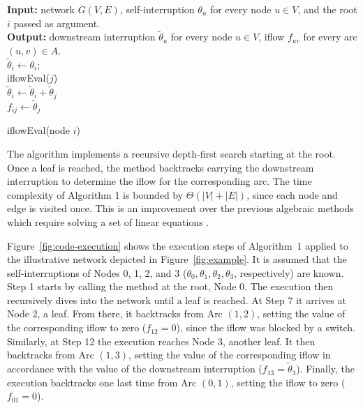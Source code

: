 \begin{algorithm}[H]
\textbf{Input:} network $G(V,E)$, self-interruption $\theta_u$ for every node $u \in V$, and the root $i$ passed as argument. \\
\textbf{Output:} downstream interruption $\tilde{\theta}_u$ for every node $u \in V$, iflow $f_{uv}$ for every arc $(u,v) \in A$. \\
\Begin
{
    $\tilde{\theta}_i \leftarrow \theta_i$; \\
	{
	    iflowEval($j$) \\
	    {
	        $\tilde{\theta}_i \leftarrow \tilde{\theta}_i + \tilde{\theta}_j$ \\
	        $f_{ij} \leftarrow \tilde{\theta}_j$
	    }
	}
}
\caption{iflowEval(node $i$)}
\label{alg:iflowEval}
\end{algorithm}

The algorithm implements a recursive depth-first search starting at the root. Once a leaf is reached, the method backtracks carrying the downstream interruption to determine the iflow for the corresponding arc. The time complexity of Algorithm 1 is bounded by $\Theta(|V|+|E|)$, since each node and edge is visited once. This is an improvement over the previous algebraic methods which require solving a set of linear equations \cite{DelgadoContrerasArroyo2018, TabaresEtal2019, LiEtAl2020a, Contreras2020}.


Figure~\ref{fig:code-execution} shows the execution steps of Algorithm~1 applied to the illustrative network depicted in Figure~\ref{fig:example}. It is assumed that the self-interruptions of Nodes 0, 1, 2, and 3 ($\theta_0, \theta_1, \theta_2, \theta_3$, respectively) are known. Step 1 starts by calling the method at the root, Node 0. The execution then recursively dives into the network until a leaf is reached. At Step 7 it arrives at Node 2, a leaf. From there, it backtracks from Arc $(1,2)$, setting the value of the corresponding iflow to zero ($f_{12} = 0$), since the iflow was blocked by a switch. Similarly, at Step 12 the execution reaches Node 3, another leaf. It then backtracks from Arc $(1,3)$, setting the value of the corresponding iflow in accordance with the value of the downstream interruption ($f_{13} = \tilde{\theta}_3$). Finally, the execution backtracks one last time from Arc $(0,1)$, setting the iflow to zero ($f_{01} = 0$). 

